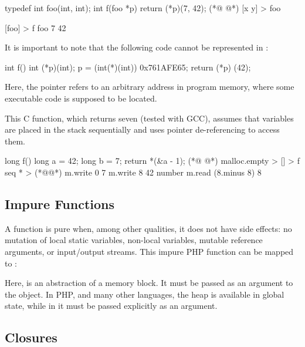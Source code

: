 \begin{ffcode}
typedef int foo(int, int);
int f(foo *p) {
  return (*p)(7, 42);
}
(*@ \ffcolumnbreak @*)
[x y] > foo

[foo] > f
  foo 7 42
\end{ffcode}

It is important to note that the following code
  cannot be represented in \eolang{}:

\begin{ffcode}
int f() {
  int (*p)(int);
  p = (int(*)(int)) 0x761AFE65;
  return (*p) (42);
}
\end{ffcode}

Here, the pointer refers to an arbitrary address in program memory,
  where some executable code is supposed to be located.

This C function, which returns seven (tested with GCC),
  assumes that variables are placed in the stack sequentially
  and uses pointer de-referencing to access them.

\begin{ffcode}
long f() {
  long a = 42;
  long b = 7;
  return *(&a - 1);
}
(*@ \ffcolumnbreak @*)
malloc.empty > [] > f
  seq * > (*@\handstroke{[m]}@*)
    m.write 0 7
    m.write 8 42
    number
      m.read (8.minus 8) 8
\end{ffcode}

\subsection{Impure Functions}

A function is pure when, among other qualities,
  it does not have side effects: no mutation of local static variables,
  non-local variables, mutable reference arguments, or input/output streams.
This impure PHP function can be mapped to \eolang{}:


Here,  is an abstraction of a memory block.
It must be passed as an argument to the  object.
In PHP, and many other languages, the heap is available in global state,
  while in \eolang{} it must be passed explicitly as an argument.

\subsection{Closures}
\label{sec:closures}

